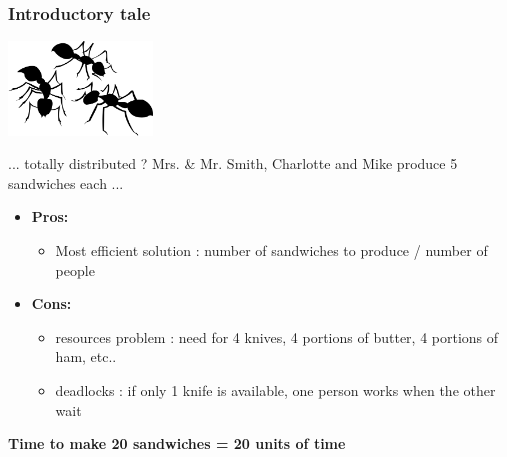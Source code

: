 \begin{frame}[containsverbatim]
\frametitle{Introductory tale}
\begin{center}
        {\includegraphics[height=2.5cm]{Day0/images/fourmis.png}}
\end{center}
\begin{center}
... totally distributed ? Mrs. \& Mr. Smith, Charlotte and Mike produce 5 sandwiches each ...
\end{center}
\begin{center}
\begin{itemize}
	\item{\textbf{Pros: }
		\begin{itemize}
			\item{Most efficient solution : number of sandwiches to produce / number of people}
		\end{itemize}
	}
	\item{\textbf{Cons: }
		\begin{itemize}
			\item{resources problem : need for 4 knives, 4 portions of butter, 4 portions of ham, etc..}
			\item{deadlocks : if only 1 knife is available, one person works when the other wait}
		\end{itemize}
	}
\end{itemize}
\textbf{Time to make 20 sandwiches = 20 units of time}
\end{center}
\end{frame}


